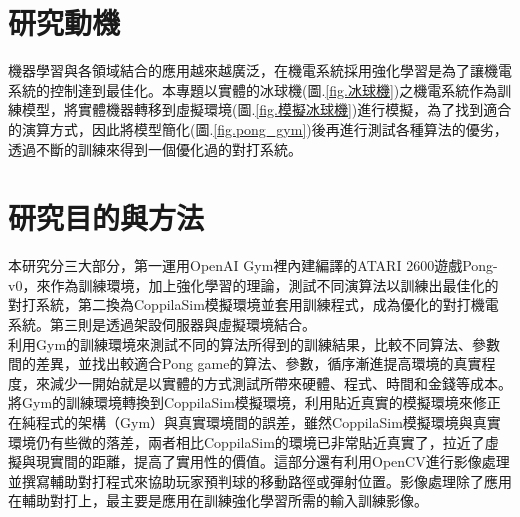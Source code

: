 \section{研究動機}
機器學習與各領域結合的應用越來越廣泛，在機電系統採用強化學習是為了讓機電系統的控制達到最佳化。本專題以實體的冰球機(圖.\ref{fig.冰球機})之機電系統作為訓練模型，將實體機器轉移到虛擬環境(圖.\ref{fig.模擬冰球機})進行模擬，為了找到適合的演算方式，因此將模型簡化(圖.\ref{fig.pong_gym})後再進行測試各種算法的優劣，透過不斷的訓練來得到一個優化過的對打系統。\\
\iffalse
\begin{figure}[hbt!]
\begin{center}
\subfigure{
\begin{minipage}[t]{0.3\linewidth}  %
\texttt{[image: 冰球機]}
\caption{\Large 實體的冰球機}\label{fig.冰球機}
\end{minipage}
}
\subfigure{
\begin{minipage}[t]{0.3\linewidth}
\texttt{[image: origin]}
\caption{\Large 虛擬環境簡化後的冰球機}\label{fig.模擬冰球機}
\end{minipage}
}
\subfigure{
\begin{minipage}[t]{0.3\linewidth} 
\texttt{[image: pong\_gym]}
\caption{\Large Gym的Pong game}\label{fig.pong_gym}
\end{minipage}
}
\end{center}
\end{figure}
\fi
\section{研究目的與方法}
 本研究分三大部分，第一運用OpenAI Gym裡內建編譯的ATARI 2600遊戲Pong-v0，來作為訓練環境，加上強化學習的理論，測試不同演算法以訓練出最佳化的對打系統，第二換為CoppilaSim模擬環境並套用訓練程式，成為優化的對打機電系統。第三則是透過架設伺服器與虛擬環境結合。\\
 
 利用Gym的訓練環境來測試不同的算法所得到的訓練結果，比較不同算法、參數間的差異，並找出較適合Pong game的算法、參數，循序漸進提高環境的真實程度，來減少一開始就是以實體的方式測試所帶來硬體、程式、時間和金錢等成本。\\

 將Gym的訓練環境轉換到CoppilaSim模擬環境，利用貼近真實的模擬環境來修正在純程式的架構（Gym）與真實環境間的誤差，雖然CoppilaSim模擬環境與真實環境仍有些微的落差，兩者相比CoppilaSim的環境已非常貼近真實了，拉近了虛擬與現實間的距離，提高了實用性的價值。這部分還有利用OpenCV進行影像處理並撰寫輔助對打程式來協助玩家預判球的移動路徑或彈射位置。影像處理除了應用在輔助對打上，最主要是應用在訓練強化學習所需的輸入訓練影像。\\
 
